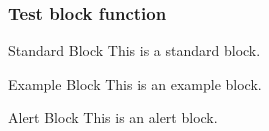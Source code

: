 \documentclass[aspectratio=43,xcolor={rgb}]{beamer}
\begin{document}
\begin{frame}
  \frametitle{Test block function}
  \begin{block}{Standard Block}
    This is a standard block.
  \end{block}
  
  \begin{exampleblock}{Example Block}
    This is an example block.
  \end{exampleblock}
  
  \begin{alertblock}{Alert Block}
    This is an alert block.
  \end{alertblock}
\end{frame}


\begin{frame}
\end{frame}
\end{document}
